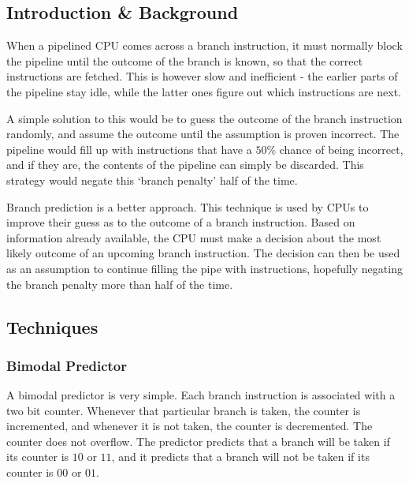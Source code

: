 
\subsection{Introduction \& Background}

When a pipelined CPU comes across a branch instruction, it must normally
block the pipeline until the outcome of the branch is known, so that the
correct instructions are fetched. This is however slow and inefficient -
the earlier parts of the pipeline stay idle, while the latter
ones figure out which instructions are next.

A simple solution to this would be to guess the outcome of the branch
instruction randomly, and assume the outcome until the assumption is
proven incorrect.
The pipeline would fill up with instructions that have a \(50\%\) chance
of being incorrect, and if they are, the contents of the pipeline
can simply be discarded.
This strategy would negate this `branch penalty' half of the time.

Branch prediction is a better approach.
This technique is used by CPUs to improve their guess as to the outcome of
a branch instruction.
Based on information already available, the CPU must make a decision about
the most likely outcome of an upcoming branch instruction. The decision can
then be used as an assumption to continue filling the pipe with instructions,
hopefully negating the branch penalty more than half of the time.

\subsection{Techniques}

\subsubsection{Bimodal Predictor}

A bimodal predictor is very simple.
Each branch instruction is associated with a two bit counter.
Whenever that particular branch is taken, the counter is incremented,
and whenever it is not taken, the counter is decremented.
The counter does not overflow.
The predictor predicts that a branch will be taken if its counter
is \(10\) or \(11\), and it predicts that a branch will not be taken
if its counter is \(00\) or \(01\).~\cite{Mcfarling1993}

